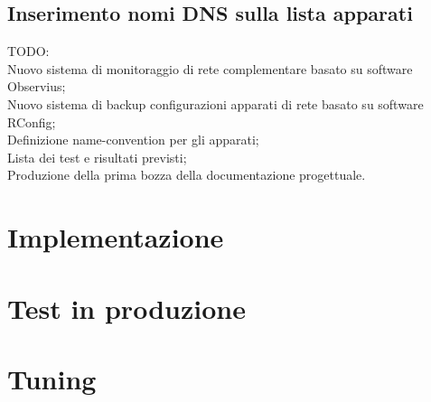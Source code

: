 \documentclass[Tesi.tex]{subfiles}
\begin{document}
\subsection{Inserimento nomi DNS sulla lista apparati}


TODO:\\
Nuovo sistema di monitoraggio di rete complementare basato su software Observius;\\
Nuovo sistema di backup configurazioni apparati di rete basato su software RConfig;\\
Definizione name-convention per gli apparati;\\
Lista dei test e risultati previsti;\\
Produzione della prima bozza della documentazione progettuale.\\


\newpage
\section{Implementazione}

\newpage
\section{Test in produzione}

\newpage
\section{Tuning}
\end{document}
